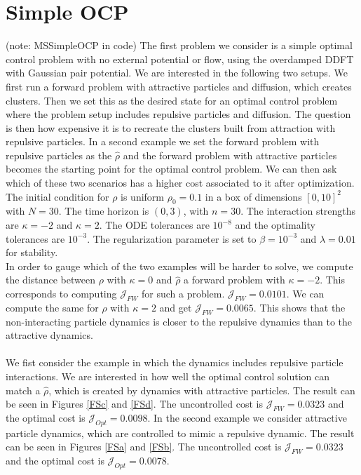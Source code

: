 \documentclass[11pt, a4paper]{article}
\theoremstyle{definition}
\newcommand{\hr}{\widehat \rho}
\begin{document}
	
\section{Simple OCP} \label{sec:SimpleOCP}
(note: MSSimpleOCP in code)
The first problem we consider is a simple optimal control problem with no external potential or flow, using the overdamped DDFT with Gaussian pair potential. We are interested in the following two setups. We first run a forward problem with attractive particles and diffusion, which creates clusters. Then we set this as the desired state for an optimal control problem where the problem setup includes repulsive particles and diffusion. The question is then how expensive it is to recreate the clusters built from attraction with repulsive particles. 
In a second example we set the forward problem with repulsive particles as the $\hr$ and the forward problem with attractive particles becomes the starting point for the optimal control problem.
We can then ask which of these two scenarios has a higher cost associated to it after optimization. 
The initial condition for $\rho$ is uniform $\rho_0 = 0.1$ in a box of dimensions $[0,10]^2$ with $N = 30$. The time horizon is $(0,3)$, with $n = 30$. The interaction strengths are $\kappa = -2$ and $\kappa = 2$. The ODE tolerances are $10^{-8}$ and the optimality tolerances are $10^{-3}$. The regularization parameter is set to $\beta = 10^{-3}$ and $\lambda = 0.01$ for stability.
\\
In order to gauge which of the two examples will be harder to solve, we compute the distance between $\rho$ with $\kappa = 0$ and $\hr$ a forward problem with $\kappa = -2$. This corresponds to computing $\mathcal J_{FW}$ for such a problem. $\mathcal J_{FW}  = 0.0101$. We can compute the same for $\hr$ with $\kappa = 2$ and get $\mathcal J_{FW} = 0.0065$. This shows that the non-interacting particle dynamics is closer to the repulsive dynamics than to the attractive dynamics. 
\\
\\
We fist consider the example in which the dynamics includes repulsive particle interactions. We are interested in how well the optimal control solution can match a $\hr$, which is created by dynamics with attractive particles. The result can be seen in Figures \ref{FSc} and \ref{FSd}. The uncontrolled cost is $\mathcal J_{FW} = 0.0323$ and the optimal cost is $\mathcal J_{Opt} =  0.0098$. In the second example we consider attractive particle dynamics, which are controlled to mimic a repulsive dynamic. The result can be seen in Figures \ref{FSa} and \ref{FSb}. The uncontrolled cost is $\mathcal J_{FW} = 0.0323$ and the optimal cost is $\mathcal J_{Opt} =  0.0078$.
	
\end{document}
